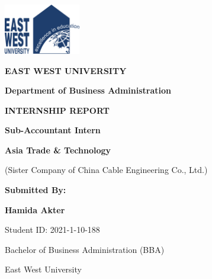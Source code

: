 
\begin{titlepage}
    \centering
    
    \vspace*{1.5cm}
    \includegraphics[width=0.25\textwidth]{assets/images/ewu_logo.png}
    
    \vspace{0.8cm}
    {\Large \textbf{EAST WEST UNIVERSITY}}
    
    \vspace{0.3cm}
    {\normalsize \textbf{Department of Business Administration}}
    
    \vspace{1.5cm}
    {\Large \textbf{INTERNSHIP REPORT}}
    
    \vspace{0.8cm}
    {\large \textbf{Sub-Accountant Intern}}
    
    \vspace{0.4cm}
    {\normalsize \textbf{Asia Trade \& Technology}}
    
    \vspace{0.3cm}
    {\normalsize (Sister Company of China Cable Engineering Co., Ltd.)}
    
    \vspace{1.5cm}
    \begin{minipage}{0.8\textwidth}
        \centering
        {\large \textbf{Submitted By:}}
        
        \vspace{0.4cm}
        {\large \textbf{Hamida Akter}}
        
        \vspace{0.3cm}
        {\normalsize Student ID: 2021-1-10-188}
        
        \vspace{0.3cm}
        {\normalsize Bachelor of Business Administration (BBA)}
        
        \vspace{0.3cm}
        {\normalsize East West University}
    \end{minipage}
    

\end{titlepage}
